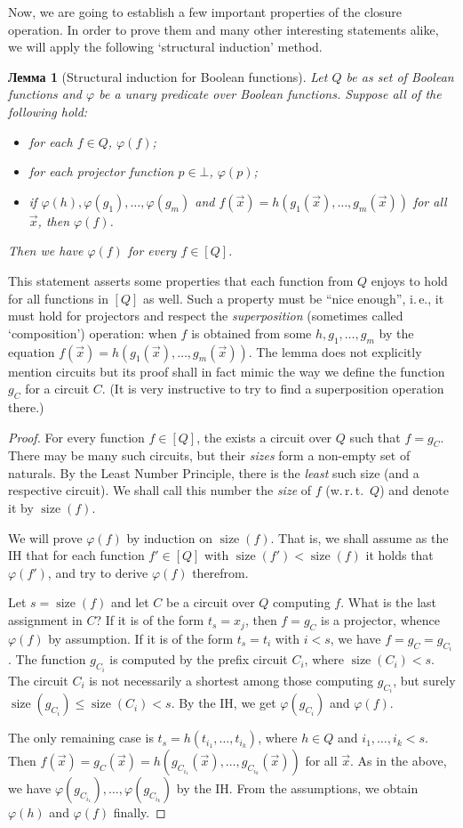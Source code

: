 \documentclass[12pt,notitlepage]{article}
\theoremstyle{plain}
\newtheorem{lemma}[thm]{Лемма}
\theoremstyle{definition}
\theoremstyle{plain}
\renewcommand{\phi}{\varphi}
\newcommand{\1}{\mathbf{1}}
\newcommand{\0}{\mathbf{0}}
\DeclareMathOperator{\sz}{\mathrm size}
\begin{document}
Now, we are going to establish a few important properties of the closure operation. In order to prove them and many other interesting statements alike, we will apply the following `structural induction' method.
\begin{lemma}[Structural induction for Boolean functions]\label{bool:struct}
	Let $Q$ be as set of Boolean functions and $\phi$ be a unary predicate over Boolean functions. Suppose all of the following hold:
	\begin{itemize}
		\item for each $f \in Q$, $\phi(f)$;
		\item for each projector function $p \in \bot$, $\phi(p)$;
		\item if $\phi(h), \phi(g_1), \ldots, \phi(g_m)$ and $f(\vec x) = h(g_1(\vec x),\ldots, g_m(\vec x))$ for all $\vec x$, then $\phi(f)$.
	\end{itemize}
	Then we have $\phi(f)$ for every $f \in [Q]$.
\end{lemma}
This statement asserts some properties that each function from $Q$ enjoys to hold for all functions in $[Q]$ as well. Such a property must be ``nice enough'', i.\,e., it must hold for projectors and respect the \emph{superposition} (sometimes called `composition') operation: when $f$ is obtained from some $h, g_1, \ldots, g_m$ by the equation $f(\vec x) = h(g_1(\vec x),\ldots, g_m(\vec x))$. The lemma does not explicitly mention circuits but its proof shall in fact mimic the way we define the function $g_C$ for a circuit $C$. (It is very instructive to try to find a superposition operation there.)
\begin{proof}
	For every function $f \in [Q]$, the exists a circuit over $Q$ such that $f = g_C$. There may be many such circuits, but their \emph{sizes} form a non-empty set of naturals. By the Least Number Principle, there is the \emph{least} such size (and a respective circuit). We shall call this number the \emph{size} of $f$ (w.\,r.\,t.\ $Q$) and denote it by $\sz(f)$.
	
	We will prove $\phi(f)$ by induction on $\sz(f)$. That is, we shall assume as the IH that for each function $f' \in [Q]$ with $\sz(f') < \sz(f)$ it holds that $\phi(f')$, and try to derive $\phi(f)$ therefrom.
	
	Let $s = \sz(f)$ and let $C$ be a circuit over $Q$ computing $f$. What is the last assignment in $C$? If it is of the form $t_s = x_j$, then $f = g_C$ is a projector, whence $\phi(f)$ by assumption. If it is of the form $t_s = t_i$ with $i < s$, we have $f = g_C = g_{C_i}$. The function $g_{C_i}$ is computed by the prefix circuit $C_i$, where $\sz(C_i) < s$.  The circuit $C_i$ is not necessarily a shortest among those computing $g_{C_i}$, but surely $\sz(g_{C_i}) \leq \sz(C_i) < s$. By the IH, we get $\phi(g_{C_i})$ and $\phi(f)$.
	
	The only remaining case is $t_s = h(t_{i_1},\ldots, t_{i_k})$, where $h \in Q$ and $i_1, \ldots, i_k < s$. Then $f(\vec x) = g_C(\vec x) = h(g_{C_{i_1}}(\vec x), \ldots, g_{C_{i_k}}(\vec x))$ for all $\vec x$. As in the above, we have $\phi(g_{C_{i_1}}), \ldots, \phi(g_{C_{i_k}})$ by the IH. From the assumptions, we obtain $\phi(h)$ and $\phi(f)$ finally.
\end{proof}
\end{document}
